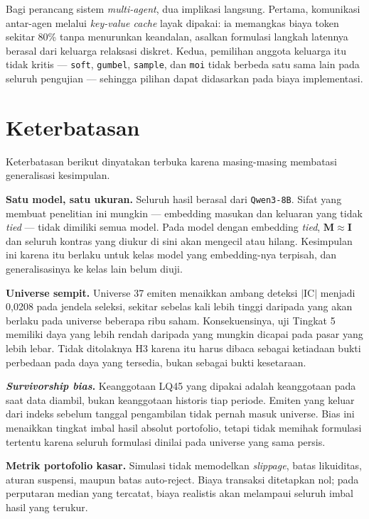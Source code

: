\documentclass{laporanta1statugm}
\newcommand{\code}[1]{\texttt{#1}}
\begin{document}
Bagi perancang sistem \textit{multi-agent}, dua implikasi langsung. Pertama,
komunikasi antar-agen melalui \textit{key-value cache} layak dipakai: ia
memangkas biaya token sekitar 80\% tanpa menurunkan keandalan, asalkan
formulasi langkah latennya berasal dari keluarga relaksasi diskret. Kedua,
pemilihan anggota keluarga itu tidak kritis --- \code{soft}, \code{gumbel},
\code{sample}, dan \code{moi} tidak berbeda satu sama lain pada seluruh
pengujian --- sehingga pilihan dapat didasarkan pada biaya implementasi.

\section{Keterbatasan}
\label{sec:batas}

Keterbatasan berikut dinyatakan terbuka karena masing-masing membatasi
generalisasi kesimpulan.

\textbf{Satu model, satu ukuran.} Seluruh hasil berasal dari \code{Qwen3-8B}.
Sifat yang membuat penelitian ini mungkin --- embedding masukan dan keluaran
yang tidak \textit{tied} --- tidak dimiliki semua model. Pada model dengan
embedding \textit{tied}, $\bm{M}\approx\bm{I}$ dan seluruh kontras yang diukur
di sini akan mengecil atau hilang. Kesimpulan ini karena itu berlaku untuk
kelas model yang embedding-nya terpisah, dan generalisasinya ke kelas lain
belum diuji.

\textbf{Universe sempit.} Universe 37 emiten menaikkan ambang deteksi
$\lvert\mathrm{IC}\rvert$ menjadi 0,0208 pada jendela seleksi, sekitar sebelas
kali lebih tinggi daripada yang akan berlaku pada universe beberapa ribu saham.
Konsekuensinya, uji Tingkat 5 memiliki daya yang lebih rendah daripada yang
mungkin dicapai pada pasar yang lebih lebar. Tidak ditolaknya H3 karena itu
harus dibaca sebagai ketiadaan bukti perbedaan pada daya yang tersedia, bukan
sebagai bukti kesetaraan.

\textbf{\textit{Survivorship bias}.} Keanggotaan LQ45 yang dipakai adalah
keanggotaan pada saat data diambil, bukan keanggotaan historis tiap periode.
Emiten yang keluar dari indeks sebelum tanggal pengambilan tidak pernah masuk
universe. Bias ini menaikkan tingkat imbal hasil absolut portofolio, tetapi
tidak memihak formulasi tertentu karena seluruh formulasi dinilai pada universe
yang sama persis.

\textbf{Metrik portofolio kasar.} Simulasi tidak memodelkan \textit{slippage},
batas likuiditas, aturan suspensi, maupun batas auto-reject. Biaya transaksi
ditetapkan nol; pada perputaran median yang tercatat, biaya realistis akan
melampaui seluruh imbal hasil yang terukur.
\end{document}
